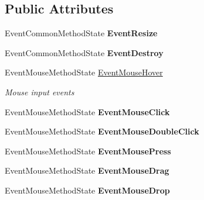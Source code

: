 \subsection*{Public Attributes}
\begin{DoxyCompactItemize}
\item 
\mbox{\label{class_space_v_i_l_1_1_prototype_a36567d59ab631969e7d025ce587cd265}} 
Event\+Common\+Method\+State {\bfseries Event\+Resize}
\item 
\mbox{\label{class_space_v_i_l_1_1_prototype_a4605e66172315b3de5c2bd0323e9378c}} 
Event\+Common\+Method\+State {\bfseries Event\+Destroy}
\item 
Event\+Mouse\+Method\+State \mbox{\hyperlink{class_space_v_i_l_1_1_prototype_aede77dddfe637d7c5395ad1cce5a7604}{Event\+Mouse\+Hover}}
\begin{DoxyCompactList}\small\item\em Mouse input events \end{DoxyCompactList}\item 
\mbox{\label{class_space_v_i_l_1_1_prototype_a92f9078d22b07c96a2b9a00eeee30ec1}} 
Event\+Mouse\+Method\+State {\bfseries Event\+Mouse\+Click}
\item 
\mbox{\label{class_space_v_i_l_1_1_prototype_a16ec8e0a319729c9e88986f114e5f4b5}} 
Event\+Mouse\+Method\+State {\bfseries Event\+Mouse\+Double\+Click}
\item 
\mbox{\label{class_space_v_i_l_1_1_prototype_a0f80329860d767891dbdbccaa663065f}} 
Event\+Mouse\+Method\+State {\bfseries Event\+Mouse\+Press}
\item 
\mbox{\label{class_space_v_i_l_1_1_prototype_a3a5e30aa2249eb257461e45ad2518987}} 
Event\+Mouse\+Method\+State {\bfseries Event\+Mouse\+Drag}
\item 
\mbox{\label{class_space_v_i_l_1_1_prototype_afdb439e707535faa3812960fb3f09e89}} 
Event\+Mouse\+Method\+State {\bfseries Event\+Mouse\+Drop}
\item 
\mbox{\label{class_space_v_i_l_1_1_prototype_a051f5bbf1989e32aff8adcc967663c17}} 

\end{DoxyCompactItemize}
